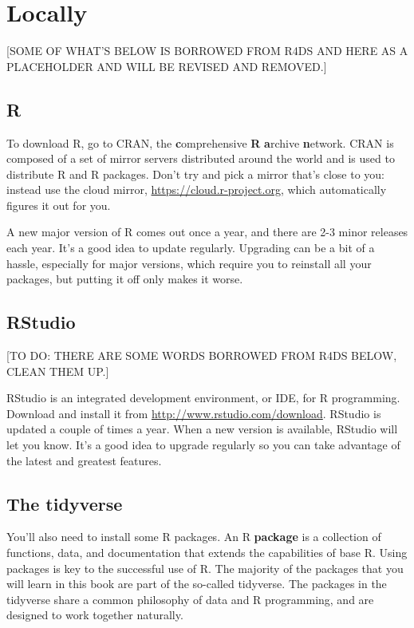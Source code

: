 \documentclass[]{book}
\theoremstyle{definition}
\theoremstyle{definition}
\theoremstyle{definition}
\theoremstyle{remark}
\begin{document}
\section{Locally}\label{locally}

{[}SOME OF WHAT'S BELOW IS BORROWED FROM R4DS AND HERE AS A PLACEHOLDER
AND WILL BE REVISED AND REMOVED.{]}

\subsection{R}\label{r}

To download R, go to CRAN, the \textbf{c}omprehensive \textbf{R}
\textbf{a}rchive \textbf{n}etwork. CRAN is composed of a set of mirror
servers distributed around the world and is used to distribute R and R
packages. Don't try and pick a mirror that's close to you: instead use
the cloud mirror, \url{https://cloud.r-project.org}, which automatically
figures it out for you.

A new major version of R comes out once a year, and there are 2-3 minor
releases each year. It's a good idea to update regularly. Upgrading can
be a bit of a hassle, especially for major versions, which require you
to reinstall all your packages, but putting it off only makes it worse.

\subsection{RStudio}\label{rstudio}

{[}TO DO: THERE ARE SOME WORDS BORROWED FROM R4DS BELOW, CLEAN THEM
UP.{]}

RStudio is an integrated development environment, or IDE, for R
programming. Download and install it from
\url{http://www.rstudio.com/download}. RStudio is updated a couple of
times a year. When a new version is available, RStudio will let you
know. It's a good idea to upgrade regularly so you can take advantage of
the latest and greatest features.

\subsection{The tidyverse}\label{the-tidyverse}

You'll also need to install some R packages. An R \textbf{package} is a
collection of functions, data, and documentation that extends the
capabilities of base R. Using packages is key to the successful use of
R. The majority of the packages that you will learn in this book are
part of the so-called tidyverse. The packages in the tidyverse share a
common philosophy of data and R programming, and are designed to work
together naturally.
\end{document}
